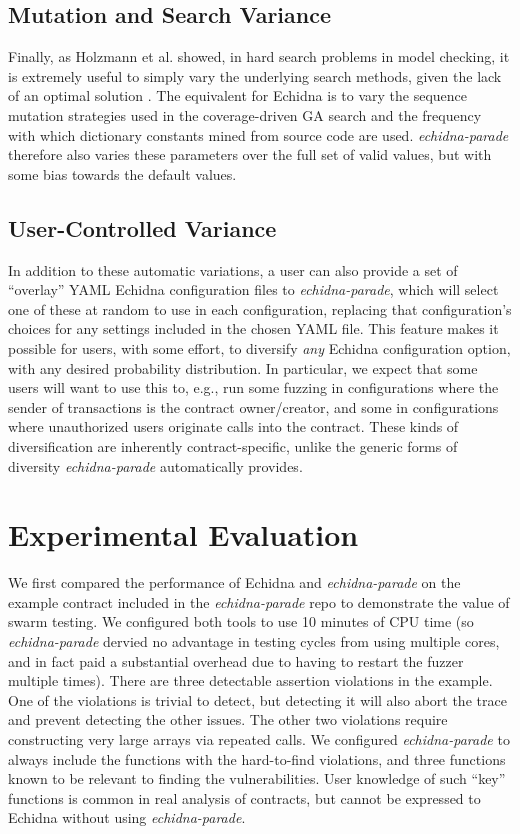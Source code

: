 \documentclass[sigconf]{acmart}
\begin{document}
{\subsection{Mutation and Search Variance}

Finally, as Holzmann et al. showed, in hard search problems in model
checking, it is extremely useful to simply vary the underlying search
methods, given the lack of an optimal solution \cite{swarmIEEE}.  The
equivalent for Echidna is to vary the sequence mutation strategies
used in the coverage-driven GA search and the frequency with which
dictionary constants mined from source code are used.
\emph{echidna-parade} therefore also varies these parameters over the
full set of valid values, but with some bias towards the default values.

\subsection{User-Controlled Variance}

In addition to these automatic variations, a user can also provide a
set of ``overlay'' YAML Echidna configuration files to
\emph{echidna-parade}, which will select one of these at random to use
in each configuration, replacing that configuration's choices for any
settings included in the chosen YAML file.  This feature makes it possible for users, with some effort, to diversify \emph{any} Echidna configuration option, with any desired probability distribution.  In particular, we expect that some users will want to use this to, e.g.,  run some fuzzing in configurations where the sender of transactions is the contract owner/creator, and some in configurations where unauthorized users originate calls into the contract.  These kinds of diversification are inherently contract-specific, unlike the generic forms of diversity \emph{echidna-parade} automatically provides.

\section{Experimental Evaluation}

We first compared the performance of Echidna and \emph{echidna-parade} on the example contract included in the \emph{echidna-parade} repo to demonstrate the value of swarm testing.  We configured both tools to use 10 minutes of CPU time (so \emph{echidna-parade} dervied no advantage in testing cycles from using multiple cores, and in fact paid a substantial overhead due to having to restart the fuzzer multiple times).  There are three detectable assertion violations in the example.  One of the violations is trivial to detect, but detecting it will also abort the trace and prevent detecting the other issues.  The other two violations require constructing very large arrays via repeated calls.  We configured \emph{echidna-parade} to always include the functions with the hard-to-find violations, and three functions known to be relevant to finding the vulnerabilities.  User knowledge of such ``key'' functions is common in real analysis of contracts, but cannot be expressed to Echidna without using \emph{echidna-parade}.

}
\end{document}

